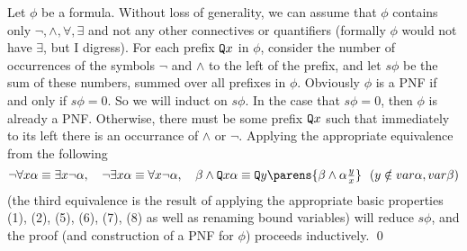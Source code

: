 Let $\phi$ be a formula.
Without loss of generality, we can assume that $\phi$ contains only $\neg,\land,\forall,\exists$ and not any other connectives or quantifiers (formally $\phi$ would not have $\exists$, but I digress).
For each prefix ${\tt Q} x$ in $\phi$, consider the number of occurrences of the symbols $\neg$ and $\land$ to the left of the prefix, and let $s\phi$ be the sum of these numbers, summed over all prefixes in
$\phi$.
Obviously $\phi$ is a PNF if and only if $s\phi=0$.
So we will induct on $s\phi$.
In the case that $s\phi=0$, then $\phi$ is already a PNF.
Otherwise, there must be some prefix ${\tt Q} x$ such that immediately to its left there is an occurrance of $\land$ or $\neg$.
Applying the appropriate equivalence from the following
$$ \neg\forall x\alpha\equiv\exists x\neg\alpha,\quad \neg\exists x\alpha\equiv\forall x\neg\alpha,\quad \beta\land\Q x\alpha\equiv\Q y\parens{\beta\land\alpha\tfrac yx}\ \ (y\notin\var\alpha,\var\beta) $$
(the third equivalence is the result of applying the appropriate basic properties (1), (2), (5), (6), (7), (8) as well as renaming bound variables)
will reduce $s\phi$, and the proof (and construction of a PNF for $\phi$) proceeds inductively.
\qed

